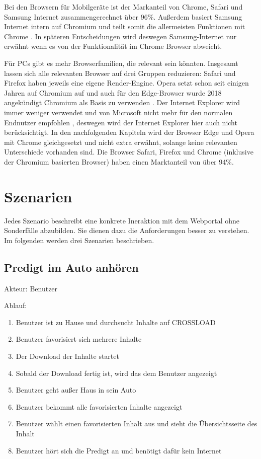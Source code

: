 Bei den Browsern für Mobilgeräte ist der Markanteil von Chrome, Safari und Samsung Internet zusammengerechnet über 96\%. Außerdem basiert Samsung Internet intern auf Chromium und teilt somit die allermeisten Funktionen mit Chrome \autocite{samsung-webkit}. In späteren Entscheidungen wird deswegen Samsung-Internet nur erwähnt wenn es von der Funktionalität im Chrome Browser abweicht.

Für PCs gibt es mehr Browserfamilien, die relevant sein könnten. Insgesamt lassen sich alle relevanten Browser auf drei Gruppen reduzieren: Safari und Firefox haben jeweils eine eigene Render-Engine. Opera setzt schon seit einigen Jahren auf Chromium auf \autocite{opera-webkit} und auch für den Edge-Browser wurde 2018 angekündigt Chromium als Basis zu verwenden \autocite{edge-faq}. Der Internet Explorer wird immer weniger verwendet und von Microsoft nicht mehr für den normalen Endnutzer empfohlen \autocite{edge-faq}, deswegen wird der Internet Explorer hier auch nicht berücksichtigt. In den nachfolgenden Kapiteln wird der Browser Edge und Opera mit Chrome gleichgesetzt und nicht extra erwähnt, solange keine relevanten Unterschiede vorhanden sind. Die Browser Safari, Firefox und Chrome (inklusive der Chromium basierten Browser) haben einen Marktanteil von über 94\%.

\section{Szenarien}
Jedes Szenario beschreibt eine konkrete Ineraktion mit dem Webportal ohne Sonderfälle abzubilden. Sie dienen dazu die Anforderungen besser zu verstehen. Im folgenden werden drei Szenarien beschrieben.

\subsection{Predigt im Auto anhören}
Akteur: Benutzer

Ablauf:
\begin{enumerate}
	\item Benutzer ist zu Hause und durchsucht Inhalte auf CROSSLOAD
	\item Benutzer favorisiert sich mehrere Inhalte
	\item Der Download der Inhalte startet
	\item Sobald der Download fertig ist, wird das dem Benutzer angezeigt
	\item Benutzer geht außer Haus in sein Auto
	\item Benutzer bekommt alle favorisierten Inhalte angezeigt
	\item Benutzer wählt einen favorisierten Inhalt aus und sieht die Übersichtsseite des Inhalt
	\item Benutzer hört sich die Predigt an und benötigt dafür kein Internet
\end{enumerate}

